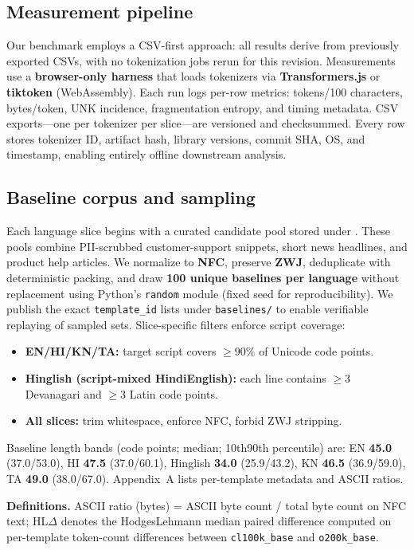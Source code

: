 \documentclass{article}
\begin{document}
\subsection{Measurement pipeline}
Our benchmark employs a CSV-first approach: all results derive from previously exported CSVs, with no tokenization jobs rerun for this revision. Measurements use a \textbf{browser-only harness} that loads tokenizers via \textbf{Transformers.js} or \textbf{tiktoken} (WebAssembly). Each run logs per-row metrics: tokens/100 characters, bytes/token, UNK incidence, fragmentation entropy, and timing metadata. CSV exports—one per tokenizer per slice—are versioned and checksummed. Every row stores tokenizer ID, artifact hash, library versions, commit SHA, OS, and timestamp, enabling entirely offline downstream analysis.

\subsection{Baseline corpus and sampling}
Each language slice begins with a curated candidate pool stored under . These pools combine PII-scrubbed customer-support snippets, short news headlines, and product help articles. We normalize to \textbf{NFC}, preserve \textbf{ZWJ}, deduplicate with deterministic packing, and draw \textbf{100 unique baselines per language} without replacement using Python's \texttt{random} module (fixed seed for reproducibility). We publish the exact \texttt{template\_id} lists under \texttt{baselines/} to enable verifiable replaying of sampled sets. Slice-specific filters enforce script coverage:
\begin{itemize}
    \item \textbf{EN/HI/KN/TA:} target script covers $\geq 90\%$ of Unicode code points.
    \item \textbf{Hinglish (script-mixed Hindi\textendash{}English):} each line contains $\geq 3$ Devanagari and $\geq 3$ Latin code points.
    \item \textbf{All slices:} trim whitespace, enforce NFC, forbid ZWJ stripping.
\end{itemize}
Baseline length bands (code points; median; 10th\textendash{}90th percentile) are: EN \textbf{45.0} (37.0/53.0), HI \textbf{47.5} (37.0/60.1), Hinglish \textbf{34.0} (25.9/43.2), KN \textbf{46.5} (36.9/59.0), TA \textbf{49.0} (38.0/67.0). Appendix~A lists per-template metadata and ASCII ratios.

\noindent\textbf{Definitions.} ASCII ratio (bytes) = ASCII byte count / total byte count on NFC text; HL$\Delta$ denotes the Hodges\textendash{}Lehmann median paired difference computed on per-template token-count differences between \texttt{cl100k\_base} and \texttt{o200k\_base}.
\end{document}
